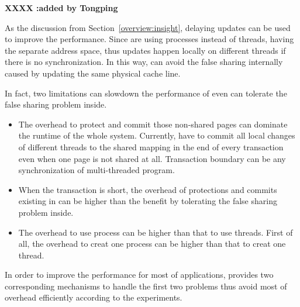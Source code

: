 \textbf{XXXX :added by Tongping}
\label{sec:patrol}

As the discussion from Section~\ref{overview:insight}, delaying updates can be used to improve the performance.
Since \sheriff{} are using processes instead of threads, having the separate address space, thus 
updates happen locally on different threads if there is no synchronization.
In this way, \sheriff{} can avoid the false sharing internally caused by updating the same physical cache line.

In fact, two limitations can slowdown the performance of \sheriff{} even \sheriff{} can tolerate the 
false sharing problem inside.
\begin{itemize}
\item
The overhead to protect and commit those non-shared pages can dominate the runtime of the whole system. Currently, 
\sheriff{} have to commit all local changes of different threads 
to the shared mapping in the end of every transaction even when one page is not shared at all. 
Transaction boundary can be any synchronization of multi-threaded program.  

\item
When the transaction is short, the overhead of protections and commits existing in \sheriff{} can be higher
than the benefit by tolerating the false sharing problem inside.

\item
The overhead to use process can be higher than that to use threads. First of all, the overhead to creat one process 
can be higher than that to creat one thread. 
\end{itemize}

In order to improve the performance for most of applications, 
\sheriffprotect{} provides two corresponding mechanisms to handle the first two problems 
thus avoid most of overhead efficiently according to the experiments. 

